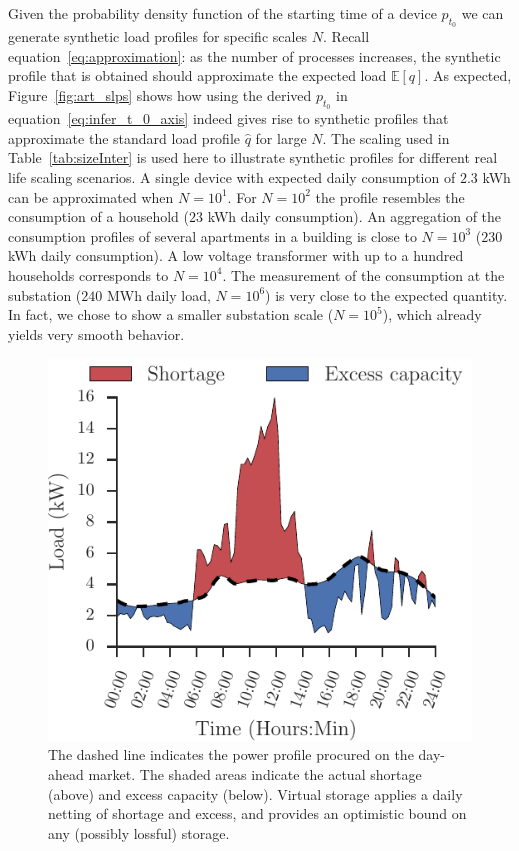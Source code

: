 \documentclass[conference]{IEEEtran}
\begin{document}
Given the probability density function of the starting time of a device $p_{t_0}$ we can generate synthetic load profiles for specific scales $N$. Recall equation~\eqref{eq:approximation}: as the number of processes increases, the synthetic profile that is obtained should approximate the expected load $\mathbb{E}[q]$. As expected, Figure~\ref{fig:art_slps} shows how using the derived $p_{t_0}$ in equation~\eqref{eq:infer_t_0_axis} indeed gives rise to synthetic profiles that approximate the standard load profile $\hat{q}$ for large $N$. The scaling used in Table~\ref{tab:sizeInter} is used here to illustrate synthetic profiles for different real life scaling scenarios. A single device with expected daily consumption of $2.3$ kWh can be approximated when $N=10^1$. For $N=10^2$ the profile resembles the consumption of a household ($23$ kWh daily consumption). An aggregation of the consumption profiles of several apartments in a building is close to $N=10^3$ ($230$ kWh daily consumption). A low voltage transformer with up to a hundred households corresponds to $N=10^4$. The measurement of the consumption at the substation ($240$ MWh daily load, $N=10^6$) is very close to the expected quantity. In fact, we chose to show a smaller substation scale ($N=10^5$), which already yields very smooth behavior.

\begin{figure}[b]
\centering
\includegraphics[scale=0.9]{figures/slp_shortage.pdf}
\caption{The dashed line indicates the power profile procured on the day-ahead market. The shaded areas indicate the actual shortage (above) and excess capacity (below). Virtual storage applies a daily netting of shortage and excess, and provides an optimistic bound on any (possibly lossful) storage.}
\label{fig:shortage}
\end{figure}
\end{document}
